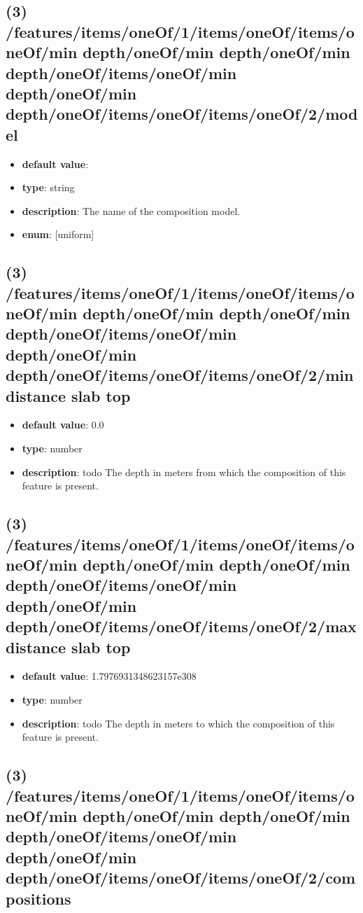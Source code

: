 \subsection{(3) /features/items/oneOf/1/items/oneOf/items/oneOf/min depth/oneOf/min depth/oneOf/min depth/oneOf/items/oneOf/min depth/oneOf/min depth/oneOf/items/oneOf/items/oneOf/2/model}
\begin{itemize}[leftmargin=3em]\item {\bf default value}: 
\item {\bf type}: string
\item {\bf description}: The name of the composition model.
\item {\bf enum}: [uniform]\end{itemize}\subsection{(3) /features/items/oneOf/1/items/oneOf/items/oneOf/min depth/oneOf/min depth/oneOf/min depth/oneOf/items/oneOf/min depth/oneOf/min depth/oneOf/items/oneOf/items/oneOf/2/min distance slab top}
\begin{itemize}[leftmargin=3em]\item {\bf default value}: 0.0
\item {\bf type}: number
\item {\bf description}: todo The depth in meters from which the composition of this feature is present.
\end{itemize}\subsection{(3) /features/items/oneOf/1/items/oneOf/items/oneOf/min depth/oneOf/min depth/oneOf/min depth/oneOf/items/oneOf/min depth/oneOf/min depth/oneOf/items/oneOf/items/oneOf/2/max distance slab top}
\begin{itemize}[leftmargin=3em]\item {\bf default value}: 1.7976931348623157e308
\item {\bf type}: number
\item {\bf description}: todo The depth in meters to which the composition of this feature is present.
\end{itemize}\subsection{(3) /features/items/oneOf/1/items/oneOf/items/oneOf/min depth/oneOf/min depth/oneOf/min depth/oneOf/items/oneOf/min depth/oneOf/min depth/oneOf/items/oneOf/items/oneOf/2/compositions}
